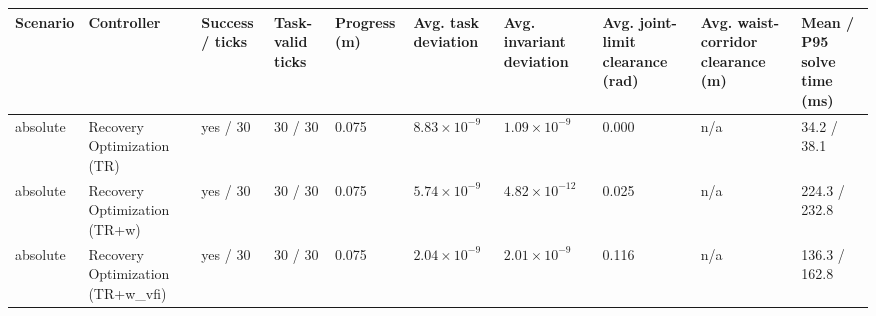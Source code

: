 \begin{tabular}{llllllllll}
\toprule
Scenario & Controller & Success / ticks & Task-valid ticks & Progress (m) & Avg. task deviation & Avg. invariant deviation & Avg. joint-limit clearance (rad) & Avg. waist-corridor clearance (m) & Mean / P95 solve time (ms) \\
\midrule
absolute & Recovery Optimization (TR) & yes / 30 & 30 / 30 & 0.075 & $8.83\times 10^{-9}$ & $1.09\times 10^{-9}$ & 0.000 & n/a & 34.2 / 38.1 \\
absolute & Recovery Optimization (TR+w) & yes / 30 & 30 / 30 & 0.075 & $5.74\times 10^{-9}$ & $4.82\times 10^{-12}$ & 0.025 & n/a & 224.3 / 232.8 \\
absolute & Recovery Optimization (TR+w\_vfi) & yes / 30 & 30 / 30 & 0.075 & $2.04\times 10^{-9}$ & $2.01\times 10^{-9}$ & 0.116 & n/a & 136.3 / 162.8 \\
\bottomrule
\end{tabular}
